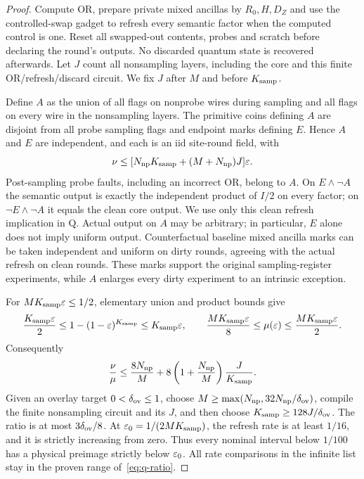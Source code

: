 \begin{proof}
Compute OR, prepare private mixed ancillas by \(R_0,H,D_Z\) and use
the controlled-swap gadget to refresh every semantic factor when the
computed control is one. Reset all swapped-out contents, probes and
scratch before declaring the round's outputs. No discarded quantum
state is recovered afterwards. Let \(J\) count all nonsampling layers,
including the core and this finite OR/refresh/discard circuit. We fix \(J\) after \(M\) and before \(K_{\rm samp}\).

Define \(A\) as the union of all flags on nonprobe wires during
sampling and all flags on every wire in the nonsampling layers.
The primitive coins defining \(A\) are disjoint from all probe
sampling flags and endpoint marks defining \(E\). Hence \(A\) and \(E\) are independent, and each is an iid site-round field, with
\begin{equation}\label{eq:q-overlay}
 \nu\le[N_{\rm np}K_{\rm samp}+(M+N_{\rm np})J]\varepsilon.
\end{equation}
Post-sampling probe faults, including an incorrect OR, belong to
\(A\). On \(E\land\neg A\) the semantic output is exactly the
independent product of \(I/2\) on every factor; on
\(\neg E\land\neg A\) it equals the clean core output. We use only
this clean refresh implication in \(\mathrm Q\). Actual output on \(A\) may be
arbitrary; in particular, \(E\) alone does not imply uniform output.
Counterfactual baseline mixed ancilla marks can be taken independent and
uniform on dirty rounds, agreeing with the actual refresh on clean
rounds. These marks support the original sampling-register experiments, while
\(A\) enlarges every dirty experiment to an intrinsic exception.

For \(MK_{\rm samp}\varepsilon\le1/2\), elementary union and product bounds give
\[
 \frac{K_{\rm samp}\varepsilon}{2}\le1-(1-\varepsilon)^{K_{\rm samp}}\le K_{\rm samp}\varepsilon,
 \qquad
 \frac{MK_{\rm samp}\varepsilon}{8}\le\mu(\varepsilon)\le\frac{MK_{\rm samp}\varepsilon}{2}.
\]
Consequently
\begin{equation}\label{eq:q-ratio}
 \frac\nu\mu\le
 \frac{8N_{\rm np}}M+
 8\left(1+\frac{N_{\rm np}}M\right)\frac{J}{K_{\rm samp}}.
\end{equation}
Given an overlay target \(0<\delta_{\rm ov}\le1\), choose
\(M\ge\max(N_{\rm np},32N_{\rm np}/\delta_{\rm ov})\), compile the
finite nonsampling circuit and its \(J\), and then choose
\(K_{\rm samp}\ge128J/\delta_{\rm ov}\). The ratio is at most
\(3\delta_{\rm ov}/8\). At \(\varepsilon_0=1/(2MK_{\rm samp})\), the refresh rate is at
least \(1/16\), and it is strictly increasing from zero. Thus every
nominal interval below \(1/100\) has a physical preimage strictly
below \(\varepsilon_0\). All rate comparisons in the infinite list stay in
the proven range of~\eqref{eq:q-ratio}.


\end{proof}
